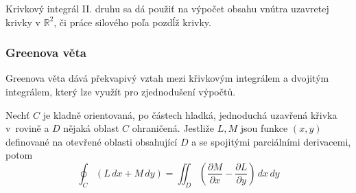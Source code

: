 \begin{example}
\end{example}

Krivkový integrál II. druhu sa dá použiť na výpočet obsahu vnútra uzavretej
krivky v $\mathbb{R}^2$, či práce silového poľa pozdĺž krivky.

\subsubsection{Greenova věta}

Greenova věta dává překvapivý vztah mezi křivkovým integrálem a dvojitým
integrálem, který lze využít pro zjednodušení výpočtů.

\begin{theorem}
    Nechť $C$ je kladně orientovaná, po částech hladká, jednoduchá
    uzavřená křivka v~rovině a $D$ nějaká oblast $C$ ohraničená.
    Jestliže $L,M$ jsou funkce $(x,y)$ definované na otevřené oblasti
    obsahující $D$ a se spojitými parciálními derivacemi, potom
    \[
    \oint_{C} (L\, dx + M\, dy) = \iint_{D} \left(\frac{\partial M}{\partial x} - \frac{\partial L}{\partial y}\right)\, dx\, dy
\]
\end{theorem}

\begin{example}
\end{example}

